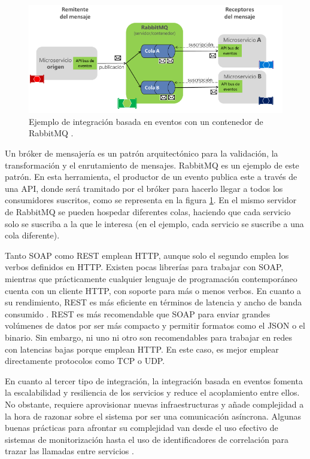 \documentclass[11pt,spanish,listoffigures]{tfgetsinf}
\begin{document}
\begin{itemize}
\begin{figure}[h]
\centering
\includegraphics[scale=0.85]{rabbitmq}
\caption{Ejemplo de integración basada en eventos con un contenedor de RabbitMQ \cite{DelaTorre2018}.}
\label{fig:rabbitmq}
\end{figure}

Un bróker de mensajería es un patrón arquitectónico para la validación, la transformación y el enrutamiento de mensajes. RabbitMQ es un ejemplo de este patrón. En esta herramienta, el productor de un evento publica este a través de una API, donde será tramitado por el bróker para hacerlo llegar a todos los consumidores suscritos, como se representa en la figura \ref{fig:rabbitmq}. En el mismo servidor de RabbitMQ se pueden hospedar diferentes colas, haciendo que cada servicio solo se suscriba a la que le interesa (en el ejemplo, cada servicio se suscribe a una cola diferente).
 
\end{itemize}

Tanto SOAP como REST emplean HTTP, aunque solo el segundo emplea los verbos definidos en HTTP. Existen pocas librerías para trabajar con SOAP, mientras que prácticamente cualquier lenguaje de programación contemporáneo cuenta con un cliente HTTP, con soporte para más o menos verbos. En cuanto a su rendimiento, REST es más eficiente en términos de latencia y ancho de banda consumido \cite{Mulligan}. REST es más recomendable que SOAP para enviar grandes volúmenes de datos por ser más compacto y permitir formatos como el JSON o el binario. Sin embargo, ni uno ni otro son recomendables para trabajar en redes con latencias bajas porque emplean HTTP. En este caso, es mejor emplear directamente protocolos como TCP o UDP. 

En cuanto al tercer tipo de integración, la integración basada en eventos fomenta la escalabilidad y resiliencia de los servicios y reduce el acoplamiento entre ellos. No obstante, requiere aprovisionar nuevas infraestructuras y añade complejidad a la hora de razonar sobre el sistema por ser una comunicación asíncrona. Algunas buenas prácticas para afrontar su complejidad van desde el uso efectivo de sistemas de monitorización hasta el uso de identificadores de correlación para trazar las llamadas entre servicios \cite{Newman2015a}. 
\end{document}
